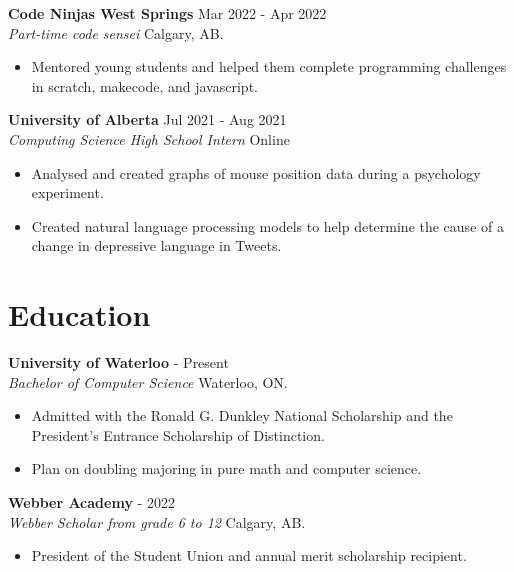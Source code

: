 \documentclass{article}
\newcommand{\moduleHeadF}[4]{
    \vspace{0.5em}
    \textbf{#1} \dotfill #2 \\[0.1em]
    \textit{#3} \hfill   #4 \\[0em]
}
\newcommand{\moduleHeadFA}[4]{
    \vspace{0.5em}
    \textbf{#1} \dotfill #2 \\[0.1em]
    \textit{#3} \hfill   #4 \\[-1em]
}
\newenvironment{compactList}
{
    \vspace{-2em}
    \begin{itemize}[itemsep=-5pt, label=$-$]
}
{
    \end{itemize}
    \vspace{-0.8em}
}
\begin{document}
\moduleHeadF{Code Ninjas West Springs}{Mar 2022 - Apr 2022}{Part-time code sensei}{Calgary, AB.}
\begin{compactList}
    \item Mentored young students and helped them complete programming challenges in scratch, makecode, and javascript.
\end{compactList}

\moduleHeadF{University of Alberta}{Jul 2021 - Aug 2021}{Computing Science High School Intern}{Online}
\begin{compactList}
    \item Analysed and created graphs of mouse position data during a psychology experiment.
    \item Created natural language processing models to help determine the cause of a change in depressive language in Tweets.
\end{compactList}


\section{Education}

\moduleHeadF{University of Waterloo}{2022 - Present}{Bachelor of Computer Science}{Waterloo, ON.}
\begin{compactList}
    \item Admitted with the Ronald G. Dunkley National Scholarship and the President's Entrance Scholarship of Distinction.
    \item Plan on doubling majoring in pure math and computer science.
\end{compactList}



\moduleHeadF{Webber Academy}{2008 - 2022}{Webber Scholar from grade 6 to 12}{Calgary, AB.}
\begin{compactList}
    \item President of the Student Union and annual merit scholarship recipient.
\end{compactList}


% 
\end{document}
